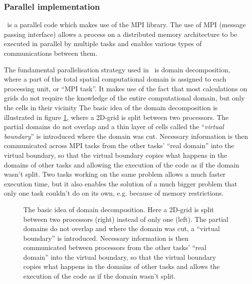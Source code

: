 \subsubsection{Parallel implementation}\label{chap:parallel}

\ramses\ is a parallel code which makes use of the MPI library.
The use of MPI (message passing interface) allows a process on a distributed memory architecture to be executed in parallel by multiple tasks and enables various types of communications between them.
 
The fundamental parallelisation strategy used in \ramses\ is domain decomposition,
where a part of the total spatial computational domain is assigned to each processing unit, or ``MPI task''.
It makes use of the fact that most calculations on grids do not require the knowledge of the entire computational domain, but only the cells in their vicinity
The basic idea of the domain decomposition is illustrated in figure \ref{fig:parallel}, where a 2D-grid is split between two processors. 
The partial domains do not overlap and a thin layer of cells called the ``\emph{virtual boundary}'' is introduced where the domain was cut. 
Necessary information is then communicated across MPI tasks from the other tasks' ``real domain'' into the virtual boundary, so that the virtual boundary copies what happens in the domains of other tasks and allowing the execution of the code as if the domain wasn't split.
Two tasks working on the same problem allows a much faster execution time, but it also enables the solution of a much bigger problem that only one task couldn't do on its own, e.g. because of memory restrictions.

\begin{figure}[htbp]
	\centering
	\caption{
		The basic idea of domain decomposition. Here a 2D-grid is split between two processors (right) instead of only one (left). 
		The partial domains do not overlap and where the domain was cut, a  ``virtual boundary'' is introduced. 
		Necessary information is then communicated between processors from the other tasks' ``real domain'' into the virtual boundary, so that the virtual boundary copies what happens in the domains of other tasks and allows the execution of the code as if the domain wasn't split.
	}
	\label{fig:parallel}
\end{figure}




